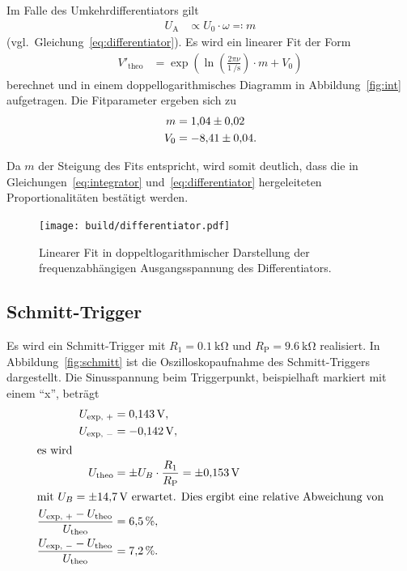 Im Falle des Umkehrdifferentiators gilt
\begin{align*}
  U_\text{A} &\propto {U_0} \cdot {\omega} \eqqcolon m
\end{align*}
(vgl.\ Gleichung~\eqref{eq:differentiator}).
Es wird ein linearer Fit der Form
\begin{align*}
  V'_\text{theo} &=
    \exp\!{\left(
      \ln\!{\left(
        \frac{2 \pi \nu}{\SI{1}{\per\second}}
      \right)}
      \cdot
      m
      + V_0
    \right)}
\end{align*}
berechnet und in einem doppellogarithmisches Diagramm in Abbildung~\ref{fig:int} aufgetragen.
Die Fitparameter ergeben sich zu
\begin{align*}
  m &= \num{1.04 \pm 0.02} \\
  V_0 &= \num{-8.41 \pm 0.04} .
\end{align*}

Da $m$ der Steigung des Fits entspricht, wird somit deutlich, dass die in
Gleichungen~\eqref{eq:integrator} und~\eqref{eq:differentiator} hergeleiteten Proportionalitäten
bestätigt werden.


\begin{figure}[ht]
  \centering
  \texttt{[image: build/differentiator.pdf]}
  \caption{Linearer Fit in doppeltlogarithmischer Darstellung der frequenzabhängigen Ausgangsspannung des Differentiators.}
  \label{fig:dif}
\end{figure}

\FloatBarrier
\subsection{Schmitt-Trigger}
Es wird ein Schmitt-Trigger mit $R_1 = \SI{0.1}{\kilo\ohm}$ und $R_\text{P} = \SI{9.6}{\kilo\ohm}$ realisiert.
In Abbildung~\ref{fig:schmitt} ist die Oszilloskopaufnahme des Schmitt-Triggers dargestellt.
Die Sinusspannung beim Triggerpunkt, beispielhaft markiert mit einem \enquote{x}, beträgt
\begin{align*}
  U_\text{exp, $+$} &= \SI{0.143}{\volt}, \\
  U_\text{exp, $-$} &= \SI{-0.142}{\volt}, \\
  \intertext{es wird}
  U_\text{theo} &= \pm U_B \cdot \frac{R_1}{R_\text{P}} = \pm \SI{0.153}{\volt} \\
  \intertext{mit $U_B = \SI{\pm 14.7}{\volt}$ erwartet. Dies ergibt eine relative Abweichung von}
  \frac{U_\text{exp, $+$} - U_\text{theo}}{U_\text{theo}} &= \SI{6.5}{\percent}, \\
  \frac{U_\text{exp, $-$} - U_\text{theo}}{U_\text{theo}} &= \SI{7.2}{\percent}.
\end{align*}

